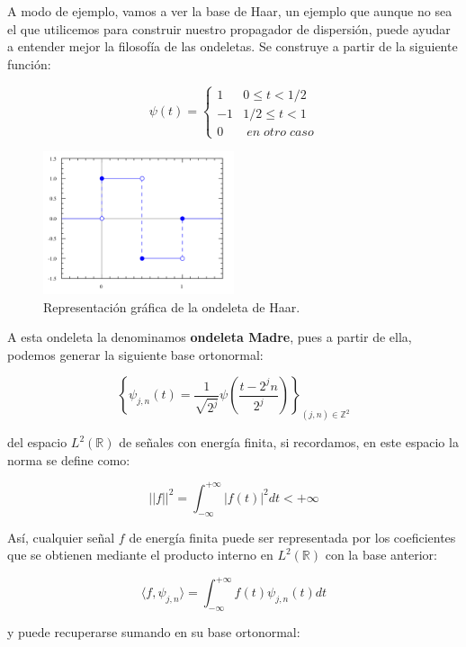 \medskip

\noindent A modo de ejemplo, vamos a ver la base de Haar, un ejemplo que aunque no sea el que utilicemos para construir nuestro propagador de dispersión, puede ayudar a entender mejor la filosofía de las ondeletas. Se construye a partir de la siguiente función: 

$$ \psi(t)= \begin{cases} 
      1 & 0\leq t < 1/2 \\
      -1 & 1/2\leq t < 1 \\
      0 & \; en \; otro \; caso
   \end{cases}$$

\begin{figure}[!h]
  \centering
  \includegraphics[width=0.5\textwidth]{img/Haar_wavelet.png}
  \caption{Representación gráfica de la ondeleta de Haar.}
  \label{fig:Ondeleta_de_Haar}
\end{figure}

\noindent A esta ondeleta la denominamos \textbf{ondeleta Madre}, pues a partir de ella, podemos generar la siguiente base ortonormal:

\medskip

$$\left \lbrace \psi_{j,n}(t)= \frac{1}{\sqrt{2^j}} \psi\left(\frac{t-2^jn}{2^j}\right) \right\rbrace_{(j,n) \in \mathbb{Z}^2}$$

\noindent del espacio $L^2(\mathbb{R})$ de señales con energía finita, si recordamos, en este espacio la norma se define como: 

  $$||f||^2=\int_{-\infty}^{+\infty} |f(t)|^2 dt < +\infty$$

\noindent Así, cualquier señal $f$ de energía finita puede ser representada por los coeficientes que se obtienen mediante el producto interno en $L^2(\mathbb{R})$ con la base anterior: 

$$\langle f,\psi_{j,n} \rangle =\int_{-\infty}^{+\infty} f(t) \psi_{j,n} (t) dt  $$

\noindent y puede recuperarse sumando en su base ortonormal:

